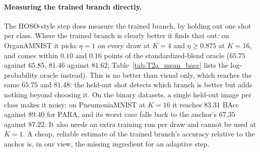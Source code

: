 \paragraph{Measuring the trained branch directly.}
The HOSO-style step does measure the trained branch, by holding out one shot per class.
Where the trained branch is clearly better it finds that out:
on OrganAMNIST it picks $\eta = 1$ on every draw at $K = 4$ and $\eta \ge 0.875$ at $K = 16$,
and comes within $0.10$ and $0.16$ points of the standardized-blend oracle
($65.75$ against $65.85$, $81.46$ against $81.62$; Table~\ref{tab:T2a_mean_bacc} lists the log-probability oracle instead).
This is no better than visual only, which reaches the same $65.75$ and $81.48$:
the held-out shot detects which branch is better but adds nothing beyond choosing it.
On the binary datasets, a single held-out image per class makes it noisy:
on PneumoniaMNIST at $K = 16$ it reaches $83.31$ BAcc against $89.40$ for PARA, and its worst case falls back to the anchor's $67.35$ against $87.22$.
It also needs an extra training run per draw and cannot be used at $K = 1$.
A cheap, reliable estimate of the trained branch's accuracy relative to the anchor is, in our view, the missing ingredient for an adaptive step.
